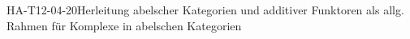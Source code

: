 
\begin{STUD}{HA-T12-04-20}{Herleitung abelscher Kategorien und additiver Funktoren als allg. Rahmen für Komplexe in abelschen Kategorien}
\end{STUD}
